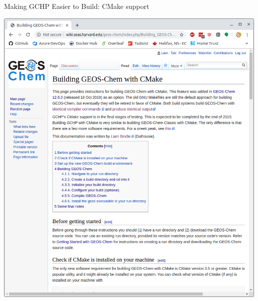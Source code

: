 \documentclass[10pt]{beamer}
\begin{document}
\begin{frame}[fragile]{Making GCHP Easier to Build: CMake support}
\begin{minipage}[c]{0.6\textwidth}
    \end{minipage}
    \begin{minipage}[c]{0.39\textwidth}
        \includegraphics[width=\textwidth]{cmake.png}
    \end{minipage}
\end{frame}
\end{document}
